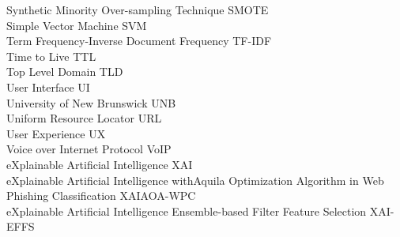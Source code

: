 Synthetic Minority Over-sampling Technique \hfill SMOTE\\
Simple Vector Machine \hfill SVM\\
Term Frequency-Inverse Document Frequency \hfill TF-IDF\\
Time to Live \hfill TTL\\
Top Level Domain \hfill TLD\\
User Interface \hfill UI\\
University of New Brunswick \hfill UNB\\
Uniform Resource Locator \hfill URL\\
User Experience \hfill UX\\
Voice over Internet Protocol \hfill VoIP\\
eXplainable Artificial Intelligence \hfill XAI\\
eXplainable Artificial Intelligence with\newline Aquila Optimization Algorithm in Web Phishing Classification \hfill XAIAOA-WPC\\
eXplainable Artificial Intelligence Ensemble-based Filter Feature Selection \hfill XAI-EFFS\\

